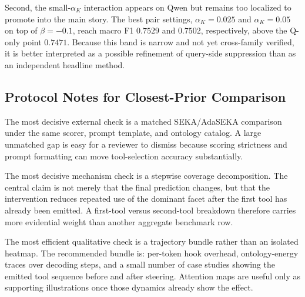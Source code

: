 Second, the small-$\alpha_K$ interaction appears on Qwen but remains too localized to promote into the main story. The best pair settings, $\alpha_K=0.025$ and $\alpha_K=0.05$ on top of $\beta=-0.1$, reach macro F1 $0.7529$ and $0.7502$, respectively, above the Q-only point $0.7471$. Because this band is narrow and not yet cross-family verified, it is better interpreted as a possible refinement of query-side suppression than as an independent headline method.

\subsection{Protocol Notes for Closest-Prior Comparison}

The most decisive external check is a matched SEKA/AdaSEKA comparison under the same scorer, prompt template, and ontology catalog. A large unmatched gap is easy for a reviewer to dismiss because scoring strictness and prompt formatting can move tool-selection accuracy substantially.

The most decisive mechanism check is a stepwise coverage decomposition. The central claim is not merely that the final prediction changes, but that the intervention reduces repeated use of the dominant facet after the first tool has already been emitted. A first-tool versus second-tool breakdown therefore carries more evidential weight than another aggregate benchmark row.

The most efficient qualitative check is a trajectory bundle rather than an isolated heatmap. The recommended bundle is: per-token hook overhead, ontology-energy traces over decoding steps, and a small number of case studies showing the emitted tool sequence before and after steering. Attention maps are useful only as supporting illustrations once those dynamics already show the effect.
